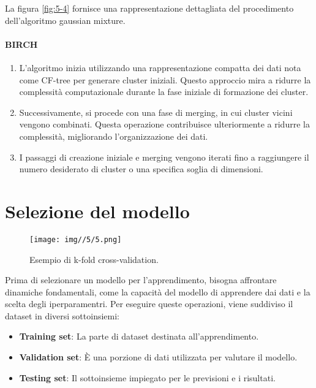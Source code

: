 \bigskip

La figura \ref{fig:5-4} fornisce una rappresentazione dettagliata del procedimento dell'algoritmo gaussian mixture.

\paragraph{BIRCH}

\begin{enumerate}
    \item L'algoritmo inizia utilizzando una rappresentazione compatta dei dati nota come CF-tree per generare cluster iniziali. Questo approccio mira a ridurre la complessità computazionale durante la fase iniziale di formazione dei cluster.
    \item Successivamente, si procede con una fase di merging, in cui cluster vicini vengono combinati. Questa operazione contribuisce ulteriormente a ridurre la complessità, migliorando l'organizzazione dei dati.
    \item I passaggi di creazione iniziale e merging vengono iterati fino a raggiungere il numero desiderato di cluster o una specifica soglia di dimensioni.
\end{enumerate}

\section{Selezione del modello}

\begin{figure}[t]
    \centering
    \texttt{[image: img//5/5.png]}
    \caption{Esempio di k-fold cross-validation.}
    \label{fig:5-5}
\end{figure}

Prima di selezionare un modello per l'apprendimento, bisogna affrontare dinamiche fondamentali, come la capacità del modello di apprendere dai dati e la scelta degli iperparamentri. Per eseguire queste operazioni, viene suddiviso il dataset in diversi sottoinsiemi:

\begin{itemize}
    \item \textbf{Training set}: La parte di dataset destinata all'apprendimento.
    \item \textbf{Validation set}: È una porzione di dati utilizzata per valutare il modello.
    \item \textbf{Testing set}: Il sottoinsieme impiegato per le previsioni e i risultati.
\end{itemize}

